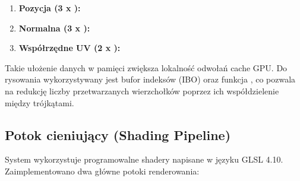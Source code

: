          \begin{enumerate}
         \item \textbf{Pozycja (3 x ):} 
         \item \textbf{Normalna (3 x ):} 
         \item \textbf{Współrzędne UV (2 x ):} 
         \end{enumerate}

         Takie ułożenie danych w pamięci zwiększa lokalność odwołań cache GPU.
         Do rysowania wykorzystywany jest bufor indeksów (IBO) oraz funkcja , co pozwala na redukcję liczby przetwarzanych wierzchołków poprzez ich współdzielenie między trójkątami.

        \subsection{Potok cieniujący (Shading Pipeline)}
         System wykorzystuje programowalne shadery napisane w języku GLSL 4.10. 
         Zaimplementowano dwa główne potoki renderowania:

